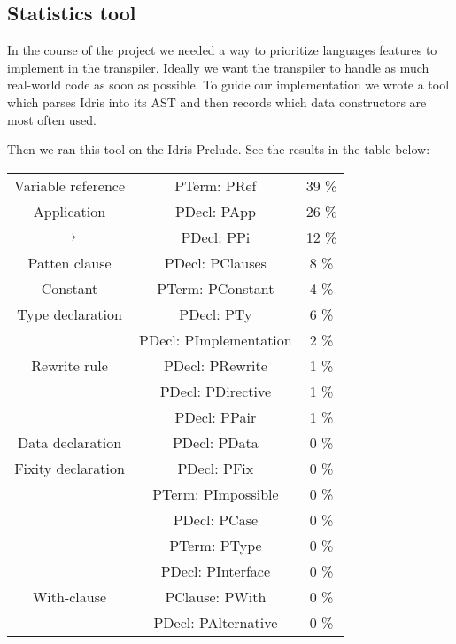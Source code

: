 \documentclass[parskip=half]{scrartcl}
\begin{document}
\subsection{Statistics tool}
In the course of the project we needed a way to prioritize languages features
to implement in the transpiler. Ideally we want the transpiler to handle
as much real-world code as soon as possible. To guide our implementation we
wrote a tool which parses Idris into its AST and then records which data
constructors are most often used.

Then we ran this tool on the Idris Prelude. See the results in the table below:


\begin{center}
  \begin{tabular}{ c c c }
    Variable reference     & PTerm: PRef             & 39 \% \\
    Application            & PDecl: PApp             & 26 \% \\
    $\rightarrow$          & PDecl: PPi              & 12 \% \\
    Patten clause          & PDecl: PClauses         & 8 \% \\
    Constant               & PTerm: PConstant        & 4 \% \\
    Type declaration       & PDecl: PTy              & 6 \% \\
                           & PDecl: PImplementation  & 2 \% \\
    Rewrite rule           & PDecl: PRewrite         & 1 \% \\
                           & PDecl: PDirective       & 1 \% \\
                           & PDecl: PPair            & 1 \% \\
    Data declaration       & PDecl: PData            & 0 \% \\
    Fixity declaration     & PDecl: PFix             & 0 \% \\
                           & PTerm: PImpossible      & 0 \% \\
                           & PDecl: PCase            & 0 \% \\
                           & PTerm: PType            & 0 \% \\
                           & PDecl: PInterface       & 0 \% \\
    With-clause            & PClause: PWith          & 0 \% \\
                           & PDecl: PAlternative     & 0 \% \\

\end{tabular}
\end{center}
\end{document}
